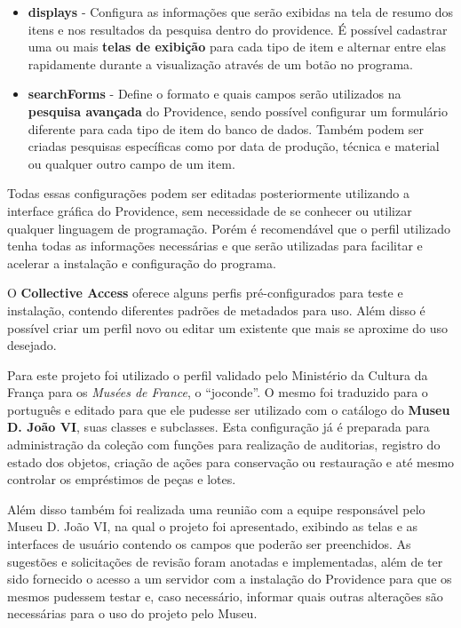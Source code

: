 \documentclass[a4paper,12pt,oneside,onecolumn,final,fleqn]{repUERJ}
\begin{document}
\begin{itemize}
	\item \textbf{displays} - Configura as informações que serão exibidas na tela de resumo dos itens e nos resultados da pesquisa dentro do providence. É possível cadastrar uma ou mais \textbf{telas de exibição} para cada tipo de item e alternar entre elas rapidamente durante a visualização através de um botão no programa.
	\item \textbf{searchForms} - Define o formato e quais campos serão utilizados na \textbf{pesquisa avançada} do Providence, sendo possível configurar um formulário diferente para cada tipo de item do banco de dados. Também podem ser criadas pesquisas específicas como por data de produção, técnica e material ou qualquer outro campo de um item.
\end{itemize}


Todas essas configurações podem ser editadas posteriormente utilizando a interface gráfica do Providence, sem necessidade de se conhecer ou utilizar qualquer linguagem de programação. Porém é recomendável que o perfil utilizado tenha todas as informações necessárias e que serão utilizadas para facilitar e acelerar a instalação e configuração do programa.

O \textbf{Collective Access} oferece alguns perfis pré-configurados para teste e instalação, contendo diferentes padrões de metadados para uso. Além disso é possível criar um perfil novo ou editar um existente que mais se aproxime do uso desejado.

Para este projeto foi utilizado o perfil validado pelo Ministério da Cultura da França para os \textit{Musées de France}, o ``joconde''. O mesmo foi traduzido para o português e editado para que ele pudesse ser utilizado com o catálogo do \textbf{Museu D. João VI}, suas classes e subclasses. Esta configuração já é preparada para administração da coleção com funções para realização de auditorias, registro do estado dos objetos, criação de ações para conservação ou restauração e até mesmo controlar os empréstimos de peças e lotes.

Além disso também foi realizada uma reunião com a equipe responsável pelo Museu D. João VI, na qual o projeto foi apresentado, exibindo as telas e as interfaces de usuário contendo os campos que poderão ser preenchidos. As sugestões e solicitações de revisão foram anotadas e implementadas, além de ter sido fornecido o acesso a um servidor com a instalação do Providence para que os mesmos pudessem testar e, caso necessário, informar quais outras alterações são necessárias para o uso do projeto pelo Museu.
\end{document}
